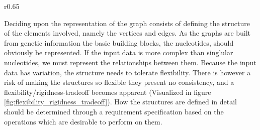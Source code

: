 \documentclass[thesis.tex]{subfiles}
\begin{document}
\begin{wrapfigure}{r}{0.65\textwidth}
\begin{mdframed}
\begin{subfigure}[t]{\textwidth}
\begin{mdframed}
\begin{center}
        \end{center}
      \end{mdframed}
      \captionsetup{skip=-8pt}
    \end{subfigure}
  \end{mdframed}
  \vspace*{-5mm}
  \caption[Two proposed graph models]{Two proposed graph models displaying flexibility (a) and rigidity (b)}
  \label{fig:flexibility_rigidness_tradeoff}
\end{wrapfigure}
Deciding upon the representation of the graph consists of defining the structure of the elements involved, namely the vertices and edges. As the graphs are built from genetic information the basic building blocks, the nucleotides, should obviously be represented. If the input data is more complex than singlular nucleotides, we must represent the relationships between them. Because the input data has variation, the structure needs to tolerate flexibility. There is however a risk of making the structures so flexible they present no consistency, and a flexibility/rigidness-tradeoff becomes apparent (Visualized in figure \ref{fig:flexibility_rigidness_tradeoff}). How the structures are defined in detail should be determined through a requirement specification based on the operations which are desirable to perform on them.
\end{document}
